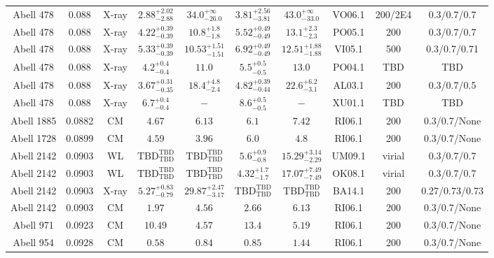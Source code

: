 \begin{table}
\begin{tabular}{cccccccccc}
Abell 478 & 0.088 & X-ray & ${2.88}^{+2.02}_{-2.88}$ & ${34.0}^{+\infty}_{-26.0}$ & ${3.81}^{+2.56}_{-3.81}$ & ${43.0}^{+\infty}_{-33.0}$ & VO06.1 & 200/2E4 & 0.3/0.7/0.7 \\
Abell 478 & 0.088 & X-ray & ${4.22}^{+0.39}_{-0.39}$ & ${10.8}^{+1.8}_{-1.8}$ & ${5.52}^{+0.49}_{-0.49}$ & ${13.1}^{+2.3}_{-2.3}$ & PO05.1 & 200 & 0.3/0.7/0.7 \\
Abell 478 & 0.088 & X-ray & ${5.33}^{+0.39}_{-0.39}$ & ${10.53}^{+1.51}_{-1.51}$ & ${6.92}^{+0.49}_{-0.49}$ & ${12.51}^{+1.88}_{-1.88}$ & VI05.1 & 500 & 0.3/0.7/0.71 \\
Abell 478 & 0.088 & X-ray & ${4.2}^{+0.4}_{-0.4}$ & ${11.0}^{}_{}$ & ${5.5}^{+0.5}_{-0.5}$ & ${13.0}^{}_{}$ & PO04.1 & TBD & TBD \\
Abell 478 & 0.088 & X-ray & ${3.67}^{+0.31}_{-0.35}$ & ${18.4}^{+4.8}_{-2.4}$ & ${4.82}^{+0.39}_{-0.44}$ & ${22.6}^{+6.2}_{-3.1}$ & AL03.1 & 200 & 0.3/0.7/0.5 \\
Abell 478 & 0.088 & X-ray & ${6.7}^{+0.4}_{-0.4}$ & ${-}^{}_{}$ & ${8.6}^{+0.5}_{-0.5}$ & ${-}^{}_{}$ & XU01.1 & TBD & TBD \\
Abell 1885 & 0.0882 & CM & ${4.67}^{}_{}$ & ${6.13}^{}_{}$ & ${6.1}^{}_{}$ & ${7.42}^{}_{}$ & RI06.1 & 200 & 0.3/0.7/None \\
Abell 1728 & 0.0899 & CM & ${4.59}^{}_{}$ & ${3.96}^{}_{}$ & ${6.0}^{}_{}$ & ${4.8}^{}_{}$ & RI06.1 & 200 & 0.3/0.7/None \\
Abell 2142 & 0.0903 & WL & ${\mathrm{TBD}}^{\mathrm{TBD}}_{\mathrm{TBD}}$ & ${\mathrm{TBD}}^{\mathrm{TBD}}_{\mathrm{TBD}}$ & ${5.6}^{+0.9}_{-0.8}$ & ${15.29}^{+3.14}_{-2.29}$ & UM09.1 & virial & 0.3/0.7/0.7 \\
Abell 2142 & 0.0903 & WL & ${\mathrm{TBD}}^{\mathrm{TBD}}_{\mathrm{TBD}}$ & ${\mathrm{TBD}}^{\mathrm{TBD}}_{\mathrm{TBD}}$ & ${4.32}^{+1.7}_{-1.7}$ & ${17.07}^{+7.49}_{-7.49}$ & OK08.1 & virial & 0.3/0.7/0.7 \\
Abell 2142 & 0.0903 & X-ray & ${5.27}^{+0.83}_{-0.79}$ & ${29.87}^{+2.47}_{-3.17}$ & ${\mathrm{TBD}}^{\mathrm{TBD}}_{\mathrm{TBD}}$ & ${\mathrm{TBD}}^{\mathrm{TBD}}_{\mathrm{TBD}}$ & BA14.1 & 200 & 0.27/0.73/0.73 \\
Abell 2142 & 0.0903 & CM & ${1.97}^{}_{}$ & ${4.56}^{}_{}$ & ${2.66}^{}_{}$ & ${6.13}^{}_{}$ & RI06.1 & 200 & 0.3/0.7/None \\
Abell 971 & 0.0923 & CM & ${10.49}^{}_{}$ & ${4.57}^{}_{}$ & ${13.4}^{}_{}$ & ${5.19}^{}_{}$ & RI06.1 & 200 & 0.3/0.7/None \\
Abell 954 & 0.0928 & CM & ${0.58}^{}_{}$ & ${0.84}^{}_{}$ & ${0.85}^{}_{}$ & ${1.44}^{}_{}$ & RI06.1 & 200 & 0.3/0.7/None \\

\end{tabular}
\end{table}
